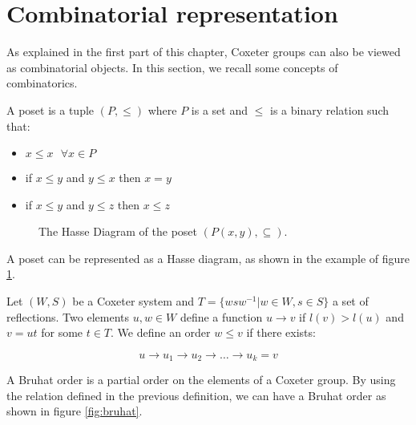 \section{Combinatorial representation}

As explained in the first part of this chapter, Coxeter groups can also be viewed as combinatorial objects. In this section, we recall some concepts of combinatorics.

\begin{definition}
  A poset is a tuple $(P, \leq)$ where $P$ is a set and $\leq$ is a binary relation such that:

  \begin{itemize}
    \item $x \leq x\ \ \ \forall x \in P$
    \item if $x \leq y$ and $y \leq x$ then $x = y$
    \item if $x \leq y$ and $y \leq z$ then $x \leq z$
  \end{itemize}
\end{definition}

\begin{figure}
  \begin{center}
\end{center}
\caption{The Hasse Diagram of the poset $(P({x,y}), \subseteq)$.}
\label{fig:hasse}
\end{figure}

A poset can be represented as a Hasse diagram, as shown in the example of figure \ref{fig:hasse}.

\begin{definition}
Let $(W,S)$ be a Coxeter system and $T = \{wsw^{-1} | w \in W, s \in S\}$ a set of reflections. Two elements $u, w \in W$ define a function $u \to v$ if $l(v) > l(u)$ and $v = ut$ for some $t \in T$.
We define an order $w \leq v$ if there exists:

\begin{equation}
u \to u_1 \to u_2 \to \dots \to u_k = v
\end{equation}
\end{definition}
A Bruhat order is a partial order on the elements of a Coxeter group. By using the relation defined in the previous definition, we can have a Bruhat order as shown in figure \ref{fig:bruhat}.

